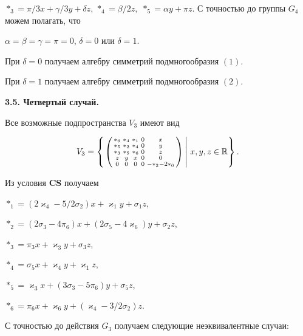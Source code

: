 $*_3=\pi/3x+\gamma/3 y+\delta z$, $*_4=\beta/2z,$ ${}*_5=\alpha


y+\pi z$. С точностью до группы $G_4$ можем полагать, что


$\alpha=\beta=\gamma=\pi=0$, $\delta=0$ или $\delta =1$.





При $\delta=0$ получаем алгебру симметрий подмногообразия $(1)$.





При $\delta=1$ получаем алгебру симметрий подмногообразия $(2)$.


\medskip





{\bf 3.5. Четвертый случай.}


Все возможные подпространства $V_3$ имеют вид


$$


V_3=\left\{\left.


\left(\begin{smallmatrix}


{}*_6&{}*_4&{}*_1&0&x \\ {}*_5&{}*_2&{}*_4&0&y\\ {}*_3 &{}*_5&{}*_6&0&z \\


z&y&x&0&0\\ 0&0&0&0&-{}*_2-2{}*_6


\end{smallmatrix}\right)\,\right|\,x,y,z\in\Bbb R\right\}.


$$





Из условия {\bf CS} получаем


$*_1=(2\varkappa_4-5/2\sigma_2)x+\varkappa_1 y+\sigma_1 z$,


$*_2=(2\sigma_3-4\pi_6) x+(2\sigma_5-4\varkappa_6)y+\sigma_2 z$,


$*_3=\pi_3x+\varkappa_3 y+\sigma_3 z$, 


$*_4=\sigma_5 x+\varkappa_4 y+\varkappa_1 z$,


$*_5=\varkappa_3 x+(3\sigma_3-5\pi_6)y+\sigma_5 z$, 


$*_6=\pi_6 x+\varkappa_6 y+(\varkappa_4-3/2\sigma_2)z$. 


С точностью до действия $G_3$ получаем следующие неэквивалентные случаи:


